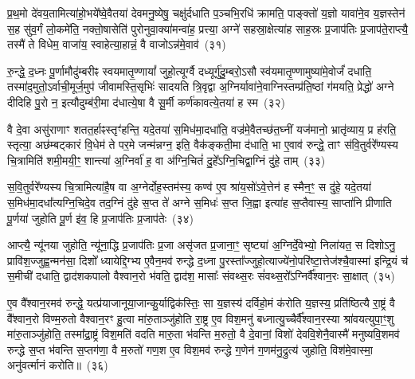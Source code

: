 प्र॒थ॒मो दे॑वय॒तामित्या॑हो॒भये᳚ष्वे॒वैतया॑ देवमनु॒ष्येषु॒ चक्षु॑र्दधाति प॒ञ्चभि॒रधि॑ क्रामति॒ पाङ्क्तो॑ य॒ज्ञो यावा॑ने॒व य॒ज्ञस्तेन॑ स॒ह सु॑व॒र्गं लो॒कमे॑ति॒ नक्तो॒षासेति॑ पुरोनुवा॒क्या॑मन्वा॑ह॒ प्रत्त्या॒ अग्ने॑ सहस्रा॒क्षेत्या॑ह साह॒स्रः प्र॒जाप॑तिः प्र॒जाप॑ते॒राप्त्यै॒ तस्मै॑ ते विधेम॒ वाजा॑य॒ स्वाहेत्या॒हान्नं॒ वै वाजो\-ऽन्न॑मे॒वाव॑~(३१)

रु॒न्द्धे॒ द॒ध्नः पू॒र्णामौदु॑म्बरीꣴ स्वयमातृ॒ण्णायां᳚ जुहो॒त्यूर्ग्वै दध्यूर्गु॑दु॒म्बरो॒\-ऽसौ स्व॑यमातृ॒ण्णामुष्या॑मे॒वोर्जं॑ दधाति॒ तस्मा॑द॒मुतो॒\-ऽर्वाची॒मूर्ज॒मुप॑ जीवामस्ति॒सृभिः॑ सादयति त्रि॒वृद्वा अ॒ग्निर्यावा॑ने॒वाग्निस्तम्प्र॑ति॒ष्ठां ग॑मयति॒ प्रेद्धो॑ अग्ने दीदिहि पु॒रो न॒ इत्यौदुम्ब॑री॒मा द॑धात्ये॒षा वै सू॒र्मी कर्ण॑कावत्ये॒तया॑ ह स्म~(३२)

वै दे॒वा असु॑राणाꣳ शतत॒र्\mbox{}हाꣴस्तृꣳ॑हन्ति॒ यदे॒तया॑ स॒मिध॑मा॒दधा॑ति॒ वज्र॑मे॒वैतच्छ॑त॒घ्नीं यज॑मानो॒ भ्रातृ॑व्याय॒ प्र ह॑रति॒ स्तृत्या॒ अछ॑म्बट्कारं वि॒धेम॑ ते पर॒मे जन्म॑न्नग्न॒ इति॒ वैक॑ङ्कती॒मा द॑धाति॒ भा ए॒वाव॑ रुन्द्धे॒ ताꣳ स॑वि॒तुर्वरे᳚ण्यस्य चि॒त्रामिति॑ शमी॒मयी॒ꣳ॒ शान्त्या॑ अ॒ग्निर्वा॑ ह॒ वा अ॑ग्नि॒चितं॑ दु॒हे᳚\-ऽग्नि॒चिद्वा॒ग्निं दु॑हे॒ ताम्~(३३)

स॒वि॒तुर्वरे᳚ण्यस्य चि॒त्रामित्या॑है॒ष वा अ॒ग्नेर्दोह॒स्तम॑स्य॒ कण्व॑ ए॒व श्रा॑य॒सो॑\-ऽवे॒त्तेन॑ ह स्मैन॒ꣳ॒ स दु॑हे॒ यदे॒तया॑ स॒मिध॑मा॒दधा᳚त्यग्नि॒चिदे॒व तद॒ग्निं दु॑हे स॒प्त ते॑ अग्ने स॒मिधः॑ स॒प्त जि॒ह्वा इत्या॑ह स॒प्तैवास्य॒ साप्ता॑नि प्रीणाति पू॒र्णया॑ जुहोति पू॒र्ण इ॑व॒ हि प्र॒जाप॑तिः प्र॒जाप॑तेः~(३४)

आप्त्यै॒ न्यू॑नया जुहोति॒ न्यू॑ना॒द्धि प्र॒जाप॑तिः प्र॒जा असृ॑जत प्र॒जाना॒ꣳ॒ सृष्ट्या॑ अ॒ग्निर्दे॒वेभ्यो॒ निला॑यत॒ स दिशो\-ऽनु॒ प्रावि॑श॒ज्जुह्व॒न्मन॑सा॒ दिशो᳚ ध्यायेद्दि॒ग्भ्य ए॒वैन॒मव॑ रुन्द्धे द॒ध्ना पु॒रस्ता᳚ज्जुहो॒त्याज्ये॑नो॒परि॑ष्टा॒त्तेज॑श्चै॒वास्मा॑ इन्द्रि॒यं च॑ स॒मीची॑ दधाति॒ द्वाद॑श\-कपालो वैश्वान॒रो भ॑वति॒ द्वाद॑श॒ मासाः᳚ संवथ्स॒रः सं॑वथ्स॒रो᳚\-ऽग्निर्वै᳚श्वान॒रः सा॒क्षात्~(३५)

ए॒व वै᳚श्वान॒रमव॑ रुन्द्धे॒ यत्प्र॑याजानूया॒जान्कु॒र्याद्विक॑स्तिः॒ सा य॒ज्ञस्य॑ दर्विहो॒मं क॑रोति य॒ज्ञस्य॒ प्रति॑ष्ठित्यै रा॒ष्ट्रं वै वै᳚श्वान॒रो विण्म॒रुतो वैश्वान॒रꣳ हु॒त्वा मा॑रु॒ताञ्जु॑होति रा॒ष्ट्र ए॒व विश॒मनु॑ बध्नात्यु॒च्चैर्वै᳚श्वान॒रस्या श्रा॑वयत्युपा॒ꣳ॒शु मा॑रु॒ताञ्जु॑होति॒ तस्मा᳚द्रा॒ष्ट्रं विश॒मति॑ वदति मारु॒ता भ॑वन्ति म॒रुतो॒ वै दे॒वानां॒ विशो॑ देववि॒शेनै॒वास्मै॑ मनुष्यवि॒शमव॑ रुन्द्धे स॒प्त भ॑वन्ति स॒प्तग॑णा॒ वै म॒रुतो॑ गण॒श ए॒व विश॒मव॑ रुन्द्धे ग॒णेन॑ ग॒णम॑नु॒द्रुत्य॑ जुहोति॒ विश॑मे॒वास्मा॒ अनु॑वर्त्मानं करोति॥~(३६)

